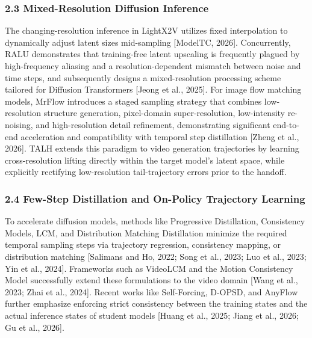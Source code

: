 \hypertarget{mixed-resolution-diffusion-inference}{%
\subsubsection{2.3 Mixed-Resolution Diffusion Inference}\label{mixed-resolution-diffusion-inference}}

The changing-resolution inference in LightX2V utilizes fixed interpolation to dynamically adjust latent sizes mid-sampling {[}ModelTC, 2026{]}. Concurrently, RALU demonstrates that training-free latent upscaling is frequently plagued by high-frequency aliasing and a resolution-dependent mismatch between noise and time steps, and subsequently designs a mixed-resolution processing scheme tailored for Diffusion Transformers {[}Jeong et al., 2025{]}. For image flow matching models, MrFlow introduces a staged sampling strategy that combines low-resolution structure generation, pixel-domain super-resolution, low-intensity re-noising, and high-resolution detail refinement, demonstrating significant end-to-end acceleration and compatibility with temporal step distillation {[}Zheng et al., 2026{]}. TALH extends this paradigm to video generation trajectories by learning cross-resolution lifting directly within the target model's latent space, while explicitly rectifying low-resolution tail-trajectory errors prior to the handoff.

\hypertarget{few-step-distillation-and-on-policy-trajectory-learning}{%
\subsubsection{2.4 Few-Step Distillation and On-Policy Trajectory Learning}\label{few-step-distillation-and-on-policy-trajectory-learning}}

To accelerate diffusion models, methods like Progressive Distillation, Consistency Models, LCM, and Distribution Matching Distillation minimize the required temporal sampling steps via trajectory regression, consistency mapping, or distribution matching {[}Salimans and Ho, 2022; Song et al., 2023; Luo et al., 2023; Yin et al., 2024{]}. Frameworks such as VideoLCM and the Motion Consistency Model successfully extend these formulations to the video domain {[}Wang et al., 2023; Zhai et al., 2024{]}. Recent works like Self-Forcing, D-OPSD, and AnyFlow further emphasize enforcing strict consistency between the training states and the actual inference states of student models {[}Huang et al., 2025; Jiang et al., 2026; Gu et al., 2026{]}.

